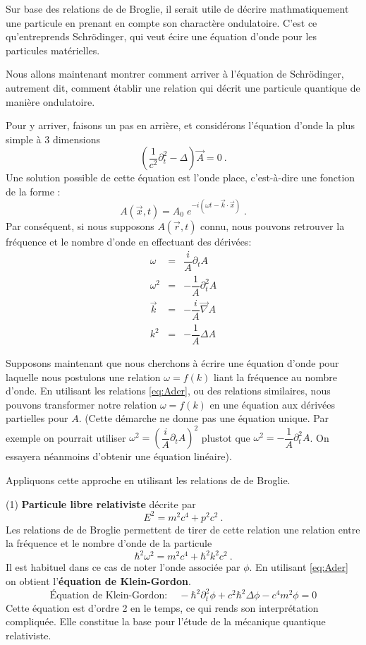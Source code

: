 \documentclass{book}
\begin{document}
Sur base des relations de de Broglie, il serait utile de décrire mathmatiquement une particule en prenant en compte son charactère ondulatoire. 
C'est ce qu'entreprends Schrödinger, qui veut écire une équation d'onde pour les particules matérielles.

Nous allons maintenant montrer comment arriver à l'équation de Schrödinger, autrement dit, comment  établir une relation qui décrit une particule quantique de manière ondulatoire. 


Pour y arriver, faisons un pas en arrière, et considérons l'équation d'onde la plus simple à 3 dimensions
$$\left(\dfrac{1}{c^2} \partial_t ^2 - \Delta \right) \vec A = 0\ .$$
Une solution possible de cette équation est l'onde place, c'est-à-dire une fonction de la forme : $$
A(\vec{x}, t) = A_0 \; e^{-i(\omega t - \vec k \cdot \vec x)} \; .$$
Par conséquent, si nous supposons $A(\vec r, t)$ connu, nous pouvons retrouver la fréquence et le nombre d'onde en effectuant des dérivées:
\begin{eqnarray}
\omega &=&\dfrac{i}{A} \partial_t A \nonumber\\
\omega^2 &=&-\dfrac{1}{A} \partial_t^2 A \nonumber\\
  \vec k &=& -\dfrac{i}{A} \vec \nabla A \nonumber\\
  k^2 &=& -\dfrac{1}{A} \Delta A\label{eq:Ader}
\end{eqnarray}

Supposons maintenant que nous cherchons à écrire une équation d'onde pour laquelle nous postulons une relation $\omega = f(k)$ liant la fréquence au nombre d'onde. En utilisant les relations \eqref{eq:Ader}, ou des relations similaires, nous pouvons transformer notre relation $\omega = f(k)$ en une équation aux dérivées partielles pour $A$. (Cette démarche ne donne pas une équation unique. Par exemple on pourrait utiliser $\omega^2 = \left(\dfrac{i}{A} \partial_t A  \right)^2$ plustot que $\omega^2 =-\dfrac{1}{A} \partial_t^2 A$. On essayera néanmoins d'obtenir une équation linéaire).

Appliquons cette approche en utilisant les relations de de Broglie.

(1) {\bf Particule libre relativiste} décrite par
$$E^2 = m^2 c^4 + p^2 c^2\ .$$
Les relations de de Broglie permettent de tirer de cette relation une relation entre la fréquence et le nombre d'onde de la particule
$$\hbar^2 \omega^2 = m^2 c^4 + \hbar^2 k^2 c^2\ .$$
Il est habituel dans ce cas de noter l'onde associée par $\phi$. En utilisant \eqref{eq:Ader} on obtient 
 l'\textbf{équation de Klein-Gordon}.
\begin{equation} 
\boxed{\text{Équation de Klein-Gordon} : \quad -\hbar ^2 \partial_t ^2 \phi + c^2 \hbar ^2 \Delta \phi - c^4 m^2 \phi = 0}
\label{Eq:KG}
\end{equation}
Cette équation est d'ordre  2 en le temps, ce qui rends son interprétation compliquée. Elle constitue la base pour l'étude de la mécanique quantique relativiste.
\end{document}
